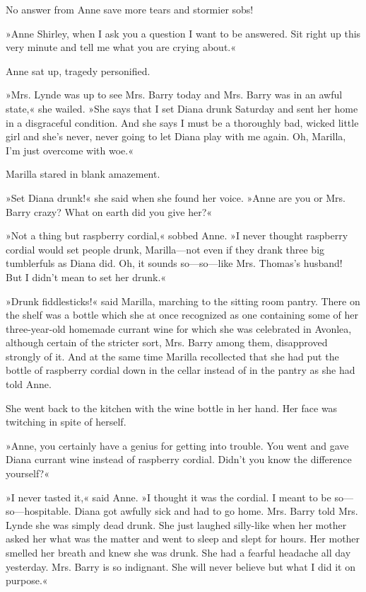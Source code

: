 No answer from Anne save more tears and stormier sobs!

»Anne Shirley, when I ask you a question I want to be answered. Sit right up this very minute and tell me what you are crying about.«

Anne sat up, tragedy personified.

»Mrs. Lynde was up to see Mrs. Barry today and Mrs. Barry was in an awful state,« she wailed. »She says that I set Diana drunk Saturday and sent her home in a disgraceful condition. And she says I must be a thoroughly bad, wicked little girl and she’s never, never going to let Diana play with me again. Oh, Marilla, I’m just overcome with woe.«

Marilla stared in blank amazement.

»Set Diana drunk!« she said when she found her voice. »Anne are you or Mrs. Barry crazy? What on earth did you give her?«

»Not a thing but raspberry cordial,« sobbed Anne. »I never thought raspberry cordial would set people drunk, Marilla—not even if they drank three big tumblerfuls as Diana did. Oh, it sounds so—so—like Mrs. Thomas’s husband! But I didn’t mean to set her drunk.«

»Drunk fiddlesticks!« said Marilla, marching to the sitting room pantry. There on the shelf was a bottle which she at once recognized as one containing some of her three-year-old homemade currant wine for which she was celebrated in Avonlea, although certain of the stricter sort, Mrs. Barry among them, disapproved strongly of it. And at the same time Marilla recollected that she had put the bottle of raspberry cordial down in the cellar instead of in the pantry as she had told Anne.

She went back to the kitchen with the wine bottle in her hand. Her face was twitching in spite of herself.

»Anne, you certainly have a genius for getting into trouble. You went and gave Diana currant wine instead of raspberry cordial. Didn’t you know the difference yourself?«

»I never tasted it,« said Anne. »I thought it was the cordial. I meant to be so—so—hospitable. Diana got awfully sick and had to go home. Mrs. Barry told Mrs. Lynde she was simply dead drunk. She just laughed silly-like when her mother asked her what was the matter and went to sleep and slept for hours. Her mother smelled her breath and knew she was drunk. She had a fearful headache all day yesterday. Mrs. Barry is so indignant. She will never believe but what I did it on purpose.«

